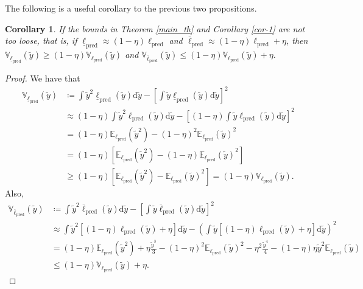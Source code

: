 \documentclass[12pt, english, oneside, a4paper]{article}
\newtheorem{corollary}{Corollary}[theorem]
\begin{document}
The following is a useful corollary to the previous two propositions.

\begin{corollary}\label{cor-3}
    If the bounds in Theorem \ref{main_th} and Corollary \ref{cor-1} are not too loose, that is, if $\underline{\ell}_\text{pred} \approx (1-\eta) \ell_\text{pred}$ and $\overline{\ell}_\text{pred} \approx (1-\eta) \ell_\text{pred} +\eta$, then $\mathbb{V}_{\underline{\ell}_\text{pred}}(\tilde{y}) \geq (1-\eta) \mathbb{V}_{\ell_\text{pred}}(\tilde{y})$ and $\mathbb{V}_{\overline{\ell}_\text{pred}}(\tilde{y}) \leq (1-\eta) \mathbb{V}_{{\ell}_\text{pred}}(\tilde{y}) + \eta$.
\end{corollary}

\begin{proof}
    We have that
    \begin{align*}
        \mathbb{V}_{\underline{\ell}_\text{pred}}(\tilde{y}) &\coloneqq \int \tilde{y}^2 \underline{\ell}_\text{pred}(\tilde{y}) \text{d}\tilde{y} - \left[\int \tilde{y} \underline{\ell}_\text{pred}(\tilde{y}) \text{d}\tilde{y}\right]^2\\
        &\approx (1-\eta) \int \tilde{y}^2 {\ell}_\text{pred}(\tilde{y}) \text{d}\tilde{y} - \left[(1-\eta) \int \tilde{y} {\ell}_\text{pred}(\tilde{y}) \text{d}\tilde{y}\right]^2\\
        &= (1-\eta) \mathbb{E}_{\ell_\text{pred}}(\tilde{y}^2) - (1-\eta)^2 \mathbb{E}_{\ell_\text{pred}}(\tilde{y})^2\\
        &= (1-\eta) \left[ \mathbb{E}_{\ell_\text{pred}}(\tilde{y}^2) - (1-\eta) \mathbb{E}_{\ell_\text{pred}}(\tilde{y})^2 \right]\\
        &\geq (1-\eta) \left[ \mathbb{E}_{\ell_\text{pred}}(\tilde{y}^2) - \mathbb{E}_{\ell_\text{pred}}(\tilde{y})^2 \right] = (1-\eta) \mathbb{V}_{\ell_\text{pred}}(\tilde{y}).
    \end{align*}
    Also,
    \begin{align*}
        \mathbb{V}_{\overline{\ell}_\text{pred}}(\tilde{y}) &\coloneqq \int \tilde{y}^2 \overline{\ell}_\text{pred}(\tilde{y}) \text{d}\tilde{y} - \left[\int \tilde{y} \overline{\ell}_\text{pred}(\tilde{y}) \text{d}\tilde{y}\right]^2\\
        &\approx \int \tilde{y}^2 \left[ (1-\eta) {\ell}_\text{pred}(\tilde{y}) +\eta \right] \text{d}\tilde{y} - \left(\int \tilde{y} \left[(1-\eta) {\ell}_\text{pred}(\tilde{y}) + \eta \right] \text{d}\tilde{y}\right)^2\\
        &= (1-\eta) \mathbb{E}_{\ell_\text{pred}}(\tilde{y}^2) + \eta \frac{\tilde y ^3}{3} - (1-\eta)^2 \mathbb{E}_{\ell_\text{pred}}(\tilde{y})^2 -\eta^2 \frac{\tilde y ^4}{4} - (1-\eta) \eta \tilde{y}^2 \mathbb{E}_{\ell_\text{pred}}(\tilde{y})\\
        &\leq (1-\eta) \mathbb{V}_{{\ell}_\text{pred}}(\tilde{y}) + \eta.
    \end{align*}
\end{proof}
\fi 
\end{document}
